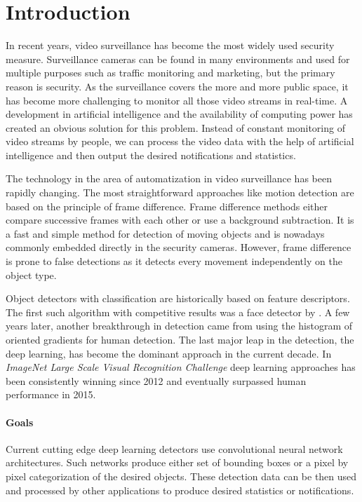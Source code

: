 \chapter*{Introduction}

In recent years, video surveillance has become the most widely used security measure. Surveillance cameras can be found in many environments and used for multiple purposes such as traffic monitoring and marketing, but the primary reason is security. As the surveillance covers the more and more public space, it has become more challenging to monitor all those video streams in real-time. A development in artificial intelligence and the availability of computing power has created an obvious solution for this problem. Instead of constant monitoring of video streams by people, we can process the video data with the help of artificial intelligence and then output the desired notifications and statistics. 

The technology in the area of automatization in video surveillance has been rapidly changing. The most straightforward approaches like motion detection are based on the principle of frame difference. Frame difference methods either compare successive frames with each other or use a background subtraction. It is a fast and simple method for detection of moving objects and is nowadays commonly embedded directly in the security cameras. However, frame difference is prone to false detections as it detects every movement independently on the object type. 

Object detectors with classification are historically based on feature descriptors. The first such algorithm with competitive results was a face detector by \citeauthor{bib:viola}. A few years later, another breakthrough in detection came from \citeauthor{bib:hog} using the histogram of oriented gradients for human detection. The last major leap in the detection, the deep learning, has become the dominant approach in the current decade. In \textit{ImageNet Large Scale Visual Recognition Challenge} deep learning approaches has been consistently winning since 2012 and eventually surpassed human performance in 2015.

\subsubsection{Goals}
Current cutting edge deep learning detectors use convolutional neural network architectures. Such networks produce either set of bounding boxes or a pixel by pixel categorization of the desired objects. These detection data can be then used and processed by other applications to produce desired statistics or notifications.

